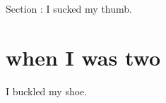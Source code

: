 {} {} 
{Section \thesection: } {} 
I sucked my thumb. 
\section{when I was two} 
I buckled my shoe. 
